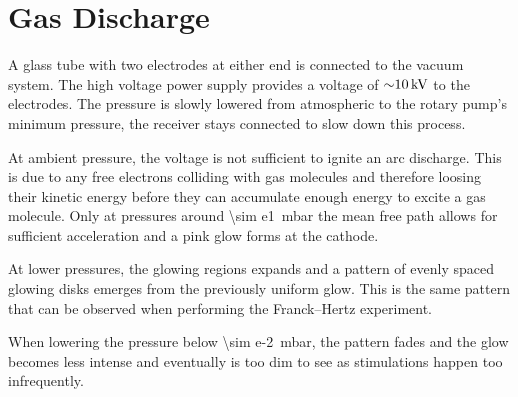 \chapter{Gas Discharge}

A glass tube with two electrodes at either end is connected to the vacuum system.
The high voltage power supply provides a voltage of $\SI{\sim10}{\kV}$ to the electrodes.
The pressure is slowly lowered from atmospheric to the rotary pump's minimum pressure, the receiver stays connected to slow down this process.

At ambient pressure, the voltage is not sufficient to ignite an arc discharge.
This is due to any free electrons colliding with gas molecules and therefore loosing their kinetic energy  before they can accumulate enough energy to excite a gas molecule.
Only at pressures around \SI{\sim e1}{\milli\bar} the mean free path allows for sufficient acceleration and a pink glow forms at the cathode.

At lower pressures, the glowing regions expands and a pattern of evenly spaced glowing disks emerges from the previously uniform glow.
This is the same pattern that can be observed when performing the Franck–Hertz experiment.

When lowering the pressure below \SI{\sim e-2}{\milli\bar}, the pattern fades and the glow becomes less intense and eventually is too dim to see as stimulations happen too infrequently.

